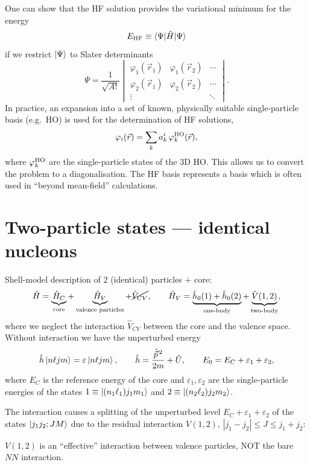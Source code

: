 \documentclass[11pt,a4paper]{article}
\newcommand{\op}[1]{\hat{#1}}
\begin{document}
One can show that the HF solution provides the variational minimum for the energy
\[
E_{\rm HF}\equiv\braket{\Psi|\op H|\Psi}
\]
if we restrict $\ket\Psi$ to Slater determinants
\[
\Psi=\frac{1}{\sqrt{A!}}
\begin{vmatrix}
\varphi_1(\vec r_1)&\varphi_1(\vec r_2)&\cdots\\
\varphi_2(\vec r_1)&\varphi_2(\vec r_2)&\cdots\\
\vdots&&\ddots
\end{vmatrix}.
\]
In practice, an expansion into a set of known, physically suitable single-particle basis (e.g.\ HO) is used for the determination of HF solutions,
\[
\varphi_i(\vec r)=\sum_k a^i_k\,\varphi^{\rm HO}_k(\vec r),
\]
where $\varphi^{\rm HO}_k$ are the single-particle states of the 3D HO. This allows us to convert the problem to a diagonalisation. The HF basis represents a basis which is often used in ``beyond mean-field'' calculations.

\section{Two-particle states --- identical nucleons}
Shell-model description of 2 (identical) particles $+$ core:
\[
\op H=\underbrace{\op H_C}_{\text{core}}+\underbrace{\op H_V}_{\text{valence particles}}+\cancel{\op V_{CV}},
\qquad
\op H_V=\underbrace{\op h_0(1)+\op h_0(2)}_{\text{one-body}}+\underbrace{\op V(1,2)}_{\text{two-body}},
\]
where we neglect the interaction $\op V_{CV}$ between the core and the valence space.
Without interaction we have the unperturbed energy
\[
\op h\ket{n\ell jm}=\varepsilon\ket{n\ell jm},\qquad \op h=\frac{\op{\vec p}^{\,2}}{2m}+\op U,
\qquad
E_0=E_C+\varepsilon_1+\varepsilon_2 ,
\]
where $E_C$ is the reference energy of the core and $\varepsilon_1,\varepsilon_2$ are the single-particle energies of the states $1\equiv\ket{(n_1\ell_1)j_1m_1}$ and $2\equiv\ket{(n_2\ell_2)j_2m_2}$.

The interaction causes a splitting of the unperturbed level $E_C+\varepsilon_1+\varepsilon_2$ of the states $\ket{j_1j_2;JM}$ due to the residual interaction $V(1,2)$, $|j_1-j_2|\le J\le j_1+j_2$:
\begin{center}
\end{center}
$V(1,2)$ is an ``effective'' interaction between valence particles, NOT the bare $NN$ interaction.
\end{document}
